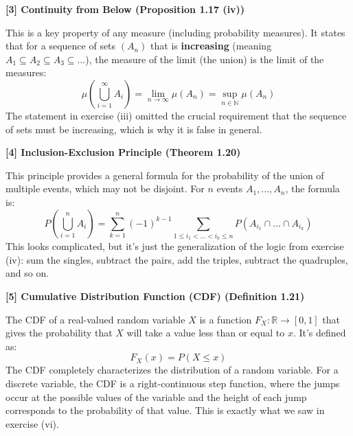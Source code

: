 \documentclass[11pt,a4paper]{article}
\begin{document}
\hypertarget{note3}{\textbf{[3] Continuity from Below (Proposition 1.17 (iv))}}
This is a key property of any measure (including probability measures). It states that for a sequence of sets $(A_n)$ that is \textbf{increasing} (meaning $A_1 \subseteq A_2 \subseteq A_3 \subseteq \dots$), the measure of the limit (the union) is the limit of the measures:
\[ \mu\left(\bigcup_{i=1}^{\infty} A_i\right) = \lim_{n \to \infty} \mu(A_n) = \sup_{n \in \mathbb{N}} \mu(A_n) \]
The statement in exercise (iii) omitted the crucial requirement that the sequence of sets must be increasing, which is why it is false in general.
\vspace{1cm}

\hypertarget{note4}{\textbf{[4] Inclusion-Exclusion Principle (Theorem 1.20)}}
This principle provides a general formula for the probability of the union of multiple events, which may not be disjoint. For $n$ events $A_1, \dots, A_n$, the formula is:
\[
P\left(\bigcup_{i=1}^{n} A_i\right) = \sum_{k=1}^{n} (-1)^{k-1} \sum_{1 \le i_1 < \dots < i_k \le n} P(A_{i_1} \cap \dots \cap A_{i_k})
\]
This looks complicated, but it's just the generalization of the logic from exercise (iv): sum the singles, subtract the pairs, add the triples, subtract the quadruples, and so on.
\vspace{1cm}

\hypertarget{note5}{\textbf{[5] Cumulative Distribution Function (CDF) (Definition 1.21)}}
The CDF of a real-valued random variable $X$ is a function $F_X: \mathbb{R} \to [0,1]$ that gives the probability that $X$ will take a value less than or equal to $x$. It's defined as:
\[ F_X(x) = P(X \leq x) \]
The CDF completely characterizes the distribution of a random variable. For a discrete variable, the CDF is a right-continuous step function, where the jumps occur at the possible values of the variable and the height of each jump corresponds to the probability of that value. This is exactly what we saw in exercise (vi).
\end{document}
